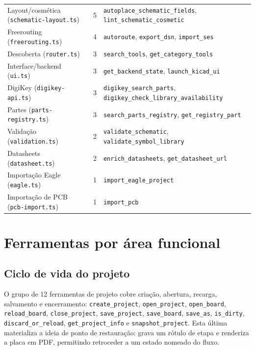 \begin{quadro}[htbp]
\begin{tabular}{@{}p{6.2cm}rp{6.2cm}@{}}
Layout/cosmética (\texttt{schematic-layout.ts}) & 5 & \texttt{autoplace\_schematic\_fields}, \texttt{lint\_schematic\_cosmetic} \\
Freerouting (\texttt{freerouting.ts}) & 4 & \texttt{autoroute}, \texttt{export\_dsn}, \texttt{import\_ses} \\
Descoberta (\texttt{router.ts}) & 3 & \texttt{search\_tools}, \texttt{get\_category\_tools} \\
Interface/backend (\texttt{ui.ts}) & 3 & \texttt{get\_backend\_state}, \texttt{launch\_kicad\_ui} \\
DigiKey (\texttt{digikey-api.ts}) & 3 & \texttt{digikey\_search\_parts}, \texttt{digikey\_check\_library\_availability} \\
Partes (\texttt{parts-registry.ts}) & 3 & \texttt{search\_parts\_registry}, \texttt{get\_registry\_part} \\
Validação (\texttt{validation.ts}) & 2 & \texttt{validate\_schematic}, \texttt{validate\_symbol\_library} \\
Datasheets (\texttt{datasheet.ts}) & 2 & \texttt{enrich\_datasheets}, \texttt{get\_datasheet\_url} \\
Importação Eagle (\texttt{eagle.ts}) & 1 & \texttt{import\_eagle\_project} \\
Importação de PCB (\texttt{pcb-import.ts}) & 1 & \texttt{import\_pcb} \\
\bottomrule
\end{tabular}
\end{quadro}

\section{Ferramentas por área funcional}

\subsection{Ciclo de vida do projeto}

O grupo de 12 ferramentas de projeto cobre criação, abertura, recarga,
salvamento e encerramento: \texttt{create\_project}, \texttt{open\_project},
\texttt{open\_board}, \texttt{reload\_board}, \texttt{close\_project},
\texttt{save\_project}, \texttt{save\_board}, \texttt{save\_as},
\texttt{is\_dirty}, \texttt{discard\_or\_reload}, \texttt{get\_project\_info}
e \texttt{snapshot\_project}. Esta última materializa a ideia de ponto de
restauração: grava um rótulo de etapa e renderiza a placa em PDF, permitindo
retroceder a um estado nomeado do fluxo.

